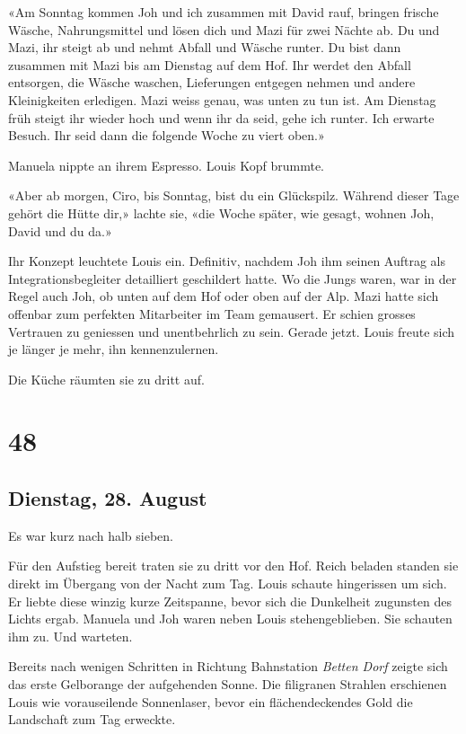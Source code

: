 «Am Sonntag kommen Joh und ich zusammen mit David rauf, bringen frische
Wäsche, Nahrungsmittel und lösen dich und Mazi für zwei Nächte ab. Du
und Mazi, ihr steigt ab und nehmt Abfall und Wäsche runter. Du bist dann
zusammen mit Mazi bis am Dienstag auf dem Hof. Ihr werdet den Abfall
entsorgen, die Wäsche waschen, Lieferungen entgegen nehmen und andere
Kleinigkeiten erledigen. Mazi weiss genau, was unten zu tun ist. Am
Dienstag früh steigt ihr wieder hoch und wenn ihr da seid, gehe ich
runter. Ich erwarte Besuch. Ihr seid dann die folgende Woche zu viert
oben.»

Manuela nippte an ihrem Espresso. Louis Kopf brummte.

«Aber ab morgen, Ciro, bis Sonntag, bist du ein Glückspilz. Während
dieser Tage gehört die Hütte dir,» lachte sie, «die Woche später, wie
gesagt, wohnen Joh, David und du da.»

Ihr Konzept leuchtete Louis ein. Definitiv, nachdem Joh ihm seinen
Auftrag als Integrationsbegleiter detailliert geschildert hatte. Wo die
Jungs waren, war in der Regel auch Joh, ob unten auf dem Hof oder oben
auf der Alp. Mazi hatte sich offenbar zum perfekten Mitarbeiter im Team
gemausert. Er schien grosses Vertrauen zu geniessen und unentbehrlich zu
sein. Gerade jetzt. Louis freute sich je länger je mehr, ihn
kennenzulernen.

Die Küche räumten sie zu dritt auf.

\chapter{48}\label{section-48}

\section{Dienstag, 28. August}\label{dienstag-28.-august}

Es war kurz nach halb sieben.

Für den Aufstieg bereit traten sie zu dritt vor den Hof. Reich beladen
standen sie direkt im Übergang von der Nacht zum Tag. Louis schaute
hingerissen um sich. Er liebte diese winzig kurze Zeitspanne, bevor sich
die Dunkelheit zugunsten des Lichts ergab. Manuela und Joh waren neben
Louis stehengeblieben. Sie schauten ihm zu. Und warteten.

Bereits nach wenigen Schritten in Richtung Bahnstation \emph{Betten
Dorf} zeigte sich das erste Gelborange der aufgehenden Sonne. Die
filigranen Strahlen erschienen Louis wie vorauseilende Sonnenlaser,
bevor ein flächendeckendes Gold die Landschaft zum Tag erweckte.

